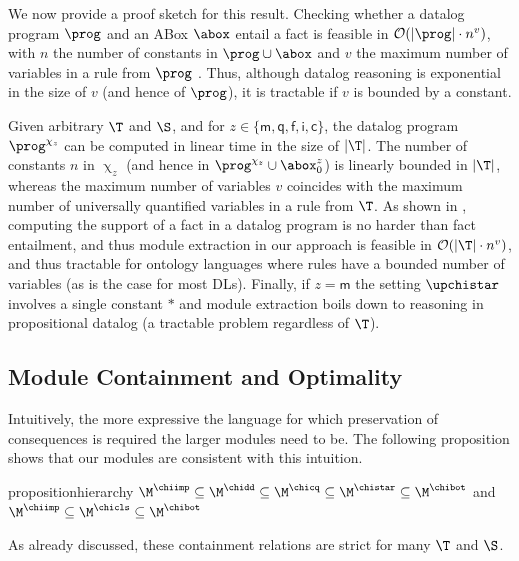 We now provide a proof sketch for this result.
Checking whether a datalog program $\prog$ and an ABox $\abox$
entail a fact
is feasible in  $\mathcal{O}(\vert \prog \vert \cdot n^v)$, with 
$n$ the number 
of constants in $\prog \cup \abox$ and $v$ the maximum
number of variables in a rule from $\prog$ \cite{DBLP:journals/csur/DantsinEGV01}.
Thus, although datalog reasoning is exponential in the size of $v$
(and hence of $\prog$), it
is tractable if $v$ is bounded by a constant.

Given arbitrary $\T$ and $\S$, and for $z \in \{\mathsf{m}, \mathsf{q}, \mathsf{f}, \mathsf{i}, \mathsf{c}\}$,
the datalog program $\prog^{\chi_z}$ 
can be computed in linear time in the size of $\vert \T \vert$.
The number of constants $n$ in $\upchi_z$ (and hence in
$\prog^{\chi_z} \cup \abox_0^z$) is
linearly bounded in $\vert \T \vert$, whereas the maximum number of 
variables $v$ coincides with the maximum number
of universally quantified variables in a rule from $\T$. 
As shown in \cite{DBLP:conf/aaai/ZhouNGH14}, 
computing the support of a fact in a datalog program is
no harder than fact entailment, and thus module extraction in our approach is
feasible in  $\mathcal{O}(\vert \T \vert \cdot n^v)$, and thus
tractable for ontology languages where rules have a bounded number of variables (as is the case for
most DLs). Finally, if $z = \mathsf{m}$ the setting $\upchistar$ involves 
a single constant $\ast$ and module extraction boils down to reasoning
in propositional datalog (a tractable problem regardless of $\T$).





\subsection{Module Containment and Optimality} \label{sec:module-containment}

Intuitively, the more expressive the language for which preservation
of consequences is required the larger modules need to be.
The following proposition shows 
that our modules are consistent with this 
intuition.
%
\begin{restatable}{proposition}{hierarchy} \label{prop:module-hierarchy}
  $\M^{\chiimp} \subseteq \M^{\chidd} \subseteq \M^{\chicq} \subseteq
  \M^{\chistar}\subseteq\M^{\chibot}$ and $\M^{\chiimp} \subseteq \M^{\chicls} \subseteq \M^{\chibot}$
\end{restatable}
%
As already discussed, these containment relations 
are strict for many $\T$ and $\S$.


